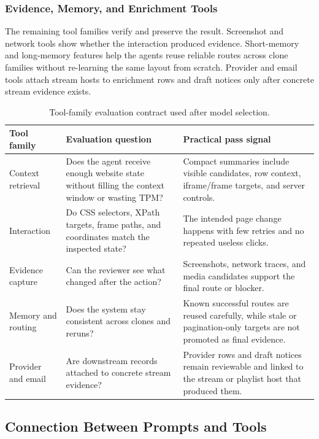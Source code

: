 \subsubsection{Evidence, Memory, and Enrichment Tools}

The remaining tool families verify and preserve the result. Screenshot and network tools
show whether the interaction produced evidence. Short-memory and long-memory features
help the agents reuse reliable routes across clone families without re-learning the same
layout from scratch. Provider and email tools attach stream hosts to enrichment rows and
draft notices only after concrete stream evidence exists.

\begin{table}[H]
\centering
\small
\begin{tabularx}{\textwidth}{Q{3.0cm}Y Y}
\toprule
{}
Tool family & Evaluation question & Practical pass signal \\
\midrule
Context retrieval & Does the agent receive enough website state without filling the
context window or wasting TPM? & Compact summaries include visible candidates, row
context, iframe/frame targets, and server controls. \\
Interaction & Do CSS selectors, XPath targets, frame paths, and coordinates match the
inspected state? & The intended page change happens with few retries and no repeated
useless clicks. \\
Evidence capture & Can the reviewer see what changed after the action? & Screenshots,
network traces, and media candidates support the final route or blocker. \\
Memory and routing & Does the system stay consistent across clones and reruns? & Known
successful routes are reused carefully, while stale or pagination-only targets are not
promoted as final evidence. \\
Provider and email & Are downstream records attached to concrete stream evidence? &
Provider rows and draft notices remain reviewable and linked to the stream or playlist
host that produced them. \\
\bottomrule
\end{tabularx}
\caption{Tool-family evaluation contract used after model selection.}
\label{tab:eval-tool-family-contract}
\end{table}

\subsection{Connection Between Prompts and Tools}

